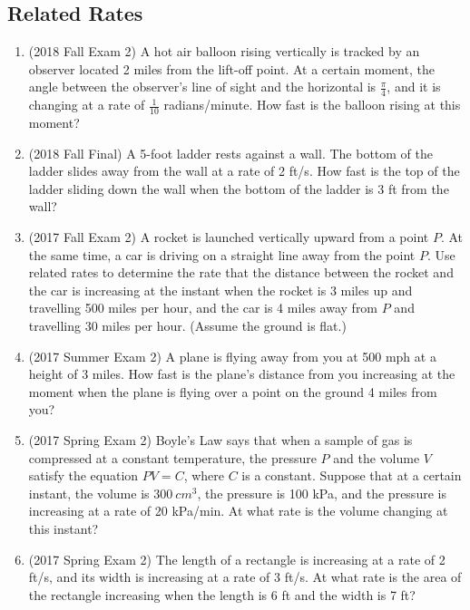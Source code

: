 \documentclass[10pt]{scrartcl}
\begin{document}
\subsection{Related Rates}
\textbf{\color{red}{Always include units!}}
\begin{enumerate}
  \item (2018 Fall Exam 2) A hot air balloon rising vertically is tracked by an observer located 2 miles from the lift-off point. At a certain moment, the angle between the observer's line of sight and the horizontal is $\tfrac\pi4$, and it is changing at a rate of $\tfrac{1}{10}$ radians/minute. How fast is the balloon rising at this moment?
  \item (2018 Fall Final) A 5-foot ladder rests against a wall. The bottom of the ladder slides away from the wall at a rate of 2 ft/s. How fast is the top of the ladder sliding down the wall when the bottom of the ladder is 3 ft from the wall? 
  \item (2017 Fall Exam 2) A rocket is launched vertically upward from a point $P$. At the same time, a car is driving on a straight line away from the point $P$. Use related rates to determine the rate that the distance between the rocket and the car is increasing at the instant when the rocket is 3 miles up and travelling 500 miles per hour, and the car is 4 miles away from $P$ and travelling 30 miles per hour. (Assume the ground is flat.)
  \item (2017 Summer Exam 2) A plane is flying away from you at 500 mph at a height of 3 miles. How fast is the plane's distance from you increasing at the moment when the plane is flying over a point on the ground 4 miles from you?
  \item (2017 Spring Exam 2) Boyle's Law says that when a sample of gas is compressed at a constant temperature, the pressure $P$ and the volume $V$ satisfy the equation $PV = C$, where $C$ is a constant. Suppose that at a certain instant, the volume is $\SI{300}{cm^3}$, the pressure is 100 kPa, and the pressure is increasing at a rate of 20 kPa/min. At what rate is the volume changing at this instant?
  \item (2017 Spring Exam 2) The length of a rectangle is increasing at a rate of 2 ft/s, and its width is increasing at a rate of 3 ft/s. At what rate is the area of the rectangle increasing when the length is 6 ft and the width is 7 ft?
\end{enumerate}
\end{document}
